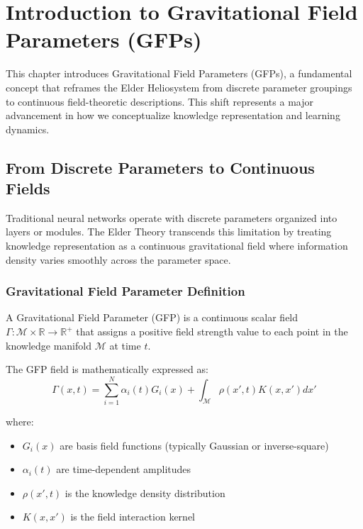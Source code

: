 \chapter{Introduction to Gravitational Field Parameters (GFPs)}

This chapter introduces Gravitational Field Parameters (GFPs), a fundamental concept that reframes the Elder Heliosystem from discrete parameter groupings to continuous field-theoretic descriptions. This shift represents a major advancement in how we conceptualize knowledge representation and learning dynamics.

\section{From Discrete Parameters to Continuous Fields}

Traditional neural networks operate with discrete parameters organized into layers or modules. The Elder Theory transcends this limitation by treating knowledge representation as a continuous gravitational field where information density varies smoothly across the parameter space.

\subsection{Gravitational Field Parameter Definition}

\begin{definition}
A Gravitational Field Parameter (GFP) is a continuous scalar field $\Gamma: \mathcal{M} \times \mathbb{R} \to \mathbb{R}^+$ that assigns a positive field strength value to each point in the knowledge manifold $\mathcal{M}$ at time $t$.
\end{definition}

The GFP field is mathematically expressed as:
\begin{equation}
\Gamma(x, t) = \sum_{i=1}^{N} \alpha_i(t) G_i(x) + \int_{\mathcal{M}} \rho(x', t) K(x, x') dx'
\end{equation}

where:
\begin{itemize}
    \item $G_i(x)$ are basis field functions (typically Gaussian or inverse-square)
    \item $\alpha_i(t)$ are time-dependent amplitudes
    \item $\rho(x', t)$ is the knowledge density distribution
    \item $K(x, x')$ is the field interaction kernel
\end{itemize}

